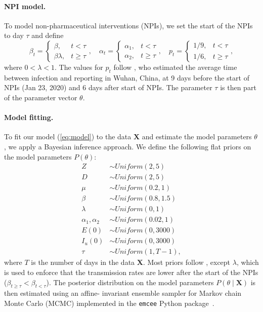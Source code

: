 \documentclass[12pt]{extarticle}
\let\vec\mathbf
\begin{document}
\paragraph*{NPI model.}
To model non-pharmaceutical interventions (NPIs), we set the start of the NPIs to day $\tau$ and define
$$
\beta_t = \begin{cases} 
  \beta, & t < \tau \\ %
  \beta \lambda, & t \ge \tau
\end{cases},
\quad
\alpha_t = \begin{cases} 
  \alpha_1, & t < \tau \\ %
  \alpha_2, & t \ge \tau
\end{cases},
\quad
p_t = \begin{cases} 
  1/9, & t < \tau \\ %
  1/6, & t \ge \tau
\end{cases},
$$
where $0 < \lambda < 1$.
The values for $p_t$ follow \citet{Li2020}, who estimated the average time between infection and reporting in Wuhan, China, at 9 days before the start of NPIs (Jan 23, 2020) and 6 days after start of NPIs.
The parameter $\tau$ is then part of the parameter vector $\theta$.

\paragraph*{Model fitting.}
To fit our model (\autoref{eq:model}) to the data $\vec{X}$ and estimate the model parameters $\theta$, we apply a Bayesian inference approach.
We define the following flat priors on the model parameters $P(\theta)$:
\begin{equation} \label{eq:priors}
\begin{aligned} %
Z & \sim \mathit{Uniform}(2, 5) \\
D & \sim \mathit{Uniform}(2, 5) \\
\mu & \sim \mathit{Uniform}(0.2, 1) \\
\beta & \sim \mathit{Uniform}(0.8, 1.5) \\
\lambda & \sim \mathit{Uniform}(0, 1) \\
\alpha_1, \alpha_2 & \sim \mathit{Uniform}(0.02, 1)\\
E(0) & \sim \mathit{Uniform}(0, 3000) \\
I_u(0) & \sim \mathit{Uniform}(0, 3000) \\
\tau &\sim \mathit{Uniform}(1, T-1),
\end{aligned}
\end{equation}
where $T$ is the number of days in the data $\vec{X}$.
Most priors follow \citet{Li2020}, except $\lambda$, which is used to enforce that the transmission rates are lower after the start of the NPIs ($\beta_{t\ge \tau} < \beta_{t < \tau}$).
The posterior distribution on the model parameters $P(\theta \mid \vec{X})$ is then estimated using an affine-
invariant ensemble sampler for Markov chain Monte Carlo (MCMC) implemented in the \texttt{emcee} Python package~\citep{Foreman-Mackey2013}.
\end{document}
